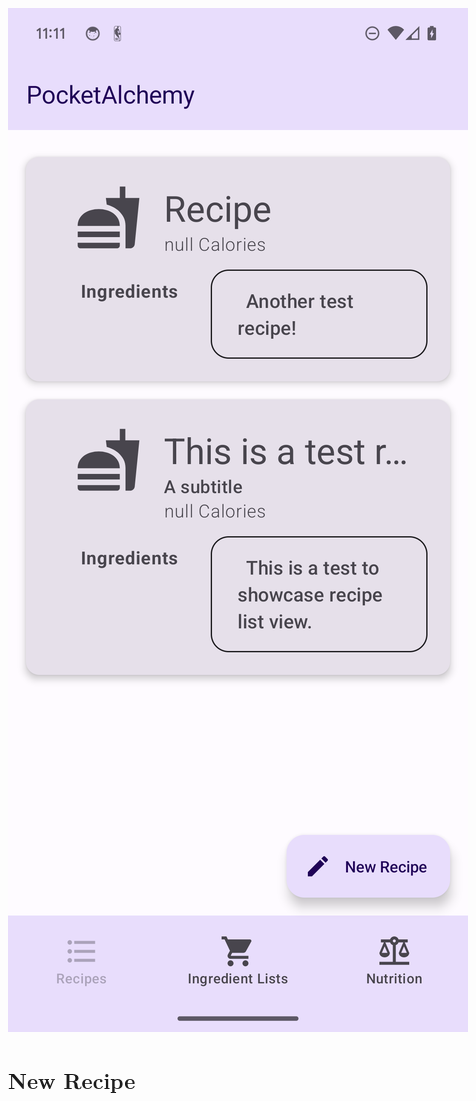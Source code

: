 \documentclass[12pt]{article}
\begin{document}
\begin{center}
\includegraphics[scale=0.175]{../res/img/RecipeListLight.png}
\end{center}

\subsection{New Recipe}
\end{document}
